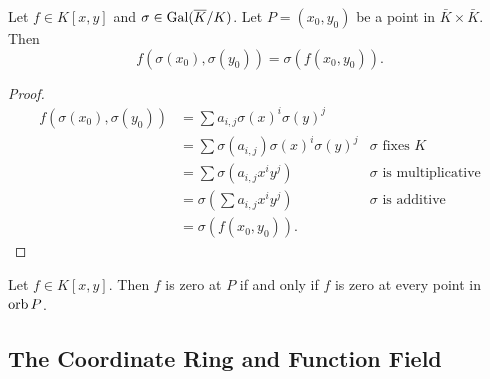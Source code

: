 \begin{lemma}
  Let $f \in K[x,y]$ and $\sigma \in \operatorname{Gal}(\overline K/K)$.
  Let $P = (x_0, y_0)$ be a point in $\bar K \times \bar K$. Then
  \[ f(\sigma(x_0), \sigma(y_0)) = \sigma(f(x_0, y_0)). \]
\end{lemma}
\begin{proof}
  \begin{align*}
    f(\sigma(x_0), \sigma(y_0))
      &= \sum a_{i,j}\sigma(x)^i\sigma(y)^j \\
      &= \sum \sigma(a_{i,j})\sigma(x)^i\sigma(y)^j
        & \text{$\sigma$ fixes $K$} \\
      &= \sum \sigma(a_{i,j}x^iy^j)
        & \text{$\sigma$ is multiplicative} \\
      &= \sigma \left( \sum a_{i,j}x^iy^j \right)
        & \text{$\sigma$ is additive} \\
      &= \sigma(f(x_0, y_0)).
  \end{align*}
\end{proof}
\begin{corollary}
  \label{cor_orb}
  Let $f \in K[x,y]$.
  Then $f$ is zero at $P$ if and only if $f$ is zero at every point in $\operatorname{orb} P$.
\end{corollary}
\begin{comment}
\begin{corollary}
  \label{cor_orb}
  Let $f \in K[x,y]$ and $\sigma \in \Gal(\bar K/K)$.
  Let $P$ be an affine point.
  Then $f$ has a zero at $P$ if and only if $f$ has a zero at $\sigma(P)$.
\end{corollary}
\begin{proof}
  ($\implies$) Suppose $f$ has a zero at a point $P = (x_0, y_0)$,
  i.e. $f(x_0, y_0) = 0$.
  Then at $\sigma(P)$,
  \[ f(\sigma(x_0), \sigma(y_0)) = \sigma(f(x_0, y_0)) = \sigma(0) = 0. \]  

  ($\impliedby$) Suppose $f$ has a zero at $\sigma(P)$, i.e. $f(\sigma(x_0), \sigma(y_0)) = 0$.
  Then $\sigma$ has an inverse $\sigma\inv \in \Gal(\bar K/K)$ and
  \[ f(x_0, y_0) = \sigma\inv(\sigma(f(x_0, y_0))) = \sigma\inv(f(\sigma(x_0), \sigma(y_0))) = \sigma\inv(0) = 0. \] 
\end{proof}
\end{comment}


\subsection{The Coordinate Ring and Function Field}

